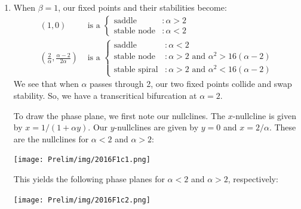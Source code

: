 \documentclass[10pt,letterpaper]{report}
\begin{document}
\begin{enumerate}
\begin{enumerate}
    \item 
    When $\beta = 1$, our fixed points and their stabilities become:
    \begin{align*}
        (1, 0) &\textrm{ is a } \begin{cases}
        \textrm{saddle} &: \alpha > 2 \\
        \textrm{stable node} &: \alpha < 2
        \end{cases}
        \\
        \left(\frac{2}{\alpha},\frac{\alpha - 2}{2\alpha} \right) &\textrm{ is a }
        \begin{cases}
        \textrm{saddle} &: \alpha < 2 \\
        \textrm{stable node} &: \alpha > 2 \textrm{ and } \alpha^2 > 16(\alpha - 2)
         \\
        \textrm{stable spiral} &: \alpha > 2 \textrm{ and } \alpha^2 < 16(\alpha - 2)
        \end{cases}
    \end{align*}
    We see that when $\alpha$ passes through 2, our two fixed points collide and swap stability. So, we have a transcritical bifurcation at $\alpha = 2$.
    
    To draw the phase plane, we first note our nullclines. The $x$-nullcline is given by $x = 1/(1 + \alpha y)$. Our $y$-nullclines are given by $y = 0$ and $x = 2/\alpha$. These are the nullclines for $\alpha < 2$ and $\alpha > 2:$
    \begin{center}
    \texttt{[image: Prelim/img/2016F1c1.png]}
    \end{center}
    This yields the following phase planes for $\alpha < 2$ and $\alpha > 2$, respectively:
    \begin{center}
    \texttt{[image: Prelim/img/2016F1c2.png]}
    \end{center}
\end{enumerate}


\end{enumerate}
\end{document}
